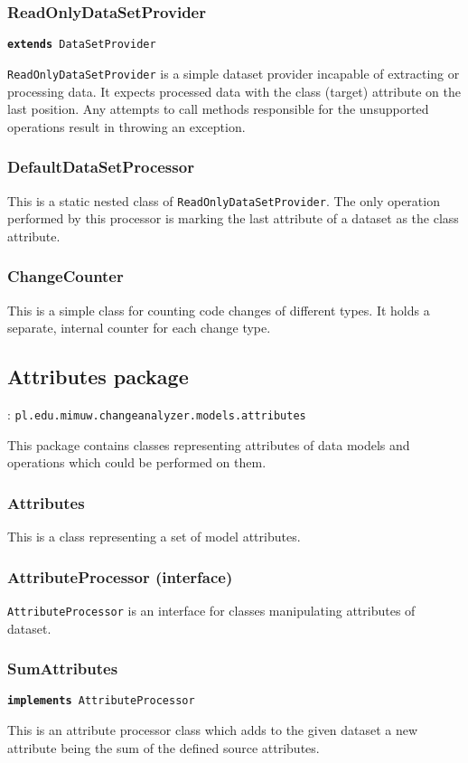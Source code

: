 \documentclass{pracamgr}
\newcommand{\pack}[3]{\subsection{#1 package} \label{sec:#2} \underline{\smash{Full package name}}: \texttt{#3}\medskip}
\newcommand{\extends}[1]{\vspace{-0.5em}\hspace{\parindent}\texttt{\textbf{extends} #1}\vspace{0.5em}}
\newcommand{\implements}[1]{\vspace{-0.5em}\hspace{\parindent}\texttt{\textbf{implements} #1}\vspace{0.5em}}
\begin{document}
\subsubsection*{ReadOnlyDataSetProvider}
\extends{DataSetProvider}

\noindent\texttt{ReadOnlyDataSetProvider} is a simple dataset provider incapable of extracting or processing data. It expects processed data with the class (target) attribute on the last position. Any attempts to call methods responsible for the unsupported operations result in throwing an exception.

\subsubsection*{DefaultDataSetProcessor}
This is a static nested class of \texttt{ReadOnlyDataSetProvider}. The only operation performed by this processor is marking the last attribute of a dataset as the class attribute.

\subsubsection*{ChangeCounter}
This is a simple class for counting code changes of different types. It holds a separate, internal counter for each change type.

\pack{Attributes}{attributes}{pl.edu.mimuw.changeanalyzer.models.attributes}

\noindent This package contains classes representing attributes of data models and operations which could be performed on them.

\subsubsection*{Attributes}
This is a class representing a set of model attributes.

\subsubsection*{AttributeProcessor (interface)}
\texttt{AttributeProcessor} is an interface for classes manipulating attributes of dataset.

\subsubsection*{SumAttributes}
\implements{AttributeProcessor}

\noindent This is an attribute processor class which adds to the given dataset a new attribute being the sum of the defined source attributes.
\end{document}
